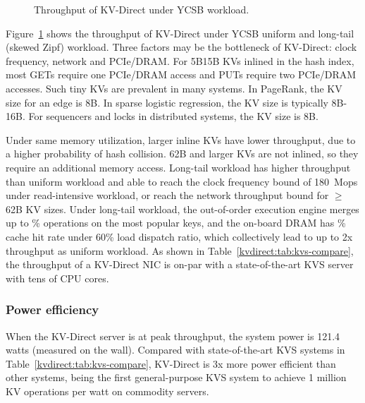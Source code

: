 \begin{figure}[t]
\centering
{}
\caption{Throughput of KV-Direct under YCSB workload.}
\label{kvdirect:fig:ycsb-tput}

\end{figure}

Figure~\ref{kvdirect:fig:ycsb-tput} shows the throughput of KV-Direct under YCSB uniform and long-tail (skewed Zipf) workload.
Three factors may be the bottleneck of KV-Direct: clock frequency, network and PCIe/DRAM.
For 5B\approx15B KVs inlined in the hash index, most GETs require one PCIe/DRAM access and PUTs require two PCIe/DRAM accesses.
Such tiny KVs are prevalent in many systems. In PageRank, the KV size for an edge is 8B. In sparse logistic regression, the KV size is typically 8B-16B. For sequencers and locks in distributed systems, the KV size is 8B.

Under same memory utilization, larger inline KVs have lower throughput, due to a higher probability of hash collision.
62B and larger KVs are not inlined, so they require an additional memory access.
Long-tail workload has higher throughput than uniform workload and able to reach the clock frequency bound of 180~Mops under read-intensive workload, or reach the network throughput bound for $\geq$62B KV sizes.
Under long-tail workload, the out-of-order execution engine merges up to \% operations on the most popular keys, and the on-board DRAM has \% cache hit rate under 60\% load dispatch ratio, which collectively lead to up to 2x throughput as uniform workload.
As shown in Table~\ref{kvdirect:tab:kvs-compare}, the throughput of a KV-Direct NIC is on-par with a state-of-the-art KVS server with tens of CPU cores.

\subsubsection{Power efficiency}

When the KV-Direct server is at peak throughput, the system power is 121.4 watts (measured on the wall).
Compared with state-of-the-art KVS systems in Table~\ref{kvdirect:tab:kvs-compare}, KV-Direct is 3x more power efficient than other systems, being the first general-purpose KVS system to achieve 1 million KV operations per watt on commodity servers.

